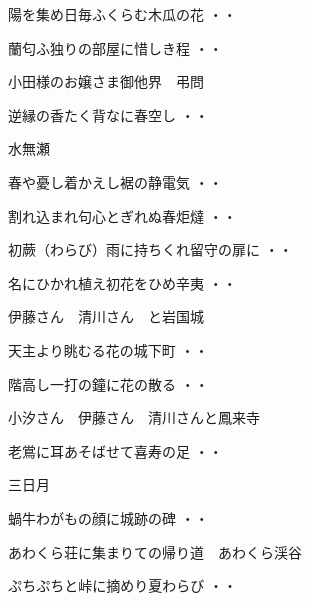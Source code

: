 \begin{shiika}陽を集め日毎ふくらむ木瓜の花
\hfill{・・}\end{shiika}
\begin{shiika}蘭匂ふ独りの部屋に惜しき程
\hfill{・・}\end{shiika}
\vspace{0.6cm}
小田様のお嬢さま御他界　弔問
\begin{shiika}逆縁の香たく背なに春空し
\hfill{・・}\end{shiika}
\vspace{0.6cm}
水無瀬
\begin{shiika}春や憂し着かえし裾の静電気
\hfill{・・}\end{shiika}
\begin{shiika}割れ込まれ句心とぎれぬ春炬燵
\hfill{・・}\end{shiika}
\begin{shiika}初蕨（わらび）雨に持ちくれ留守の扉に
\hfill{・・}\end{shiika}
\begin{shiika}名にひかれ植え初花をひめ辛夷
\hfill{・・}\end{shiika}
\vspace{0.6cm}
伊藤さん　清川さん　と岩国城
\begin{shiika}天主より眺むる花の城下町
\hfill{・・}\end{shiika}
\begin{shiika}階高し一打の鐘に花の散る
\hfill{・・}\end{shiika}
\vspace{0.6cm}
小汐さん　伊藤さん　清川さんと鳳来寺
\begin{shiika}老鴬に耳あそばせて喜寿の足
\hfill{・・}\end{shiika}
\vspace{0.6cm}
三日月
\begin{shiika}蝸牛わがもの顔に城跡の碑
\hfill{・・}\end{shiika}
\vspace{0.6cm}
あわくら荘に集まりての帰り道　あわくら渓谷
\begin{shiika}ぷちぷちと峠に摘めり夏わらび
\hfill{・・}\end{shiika}
